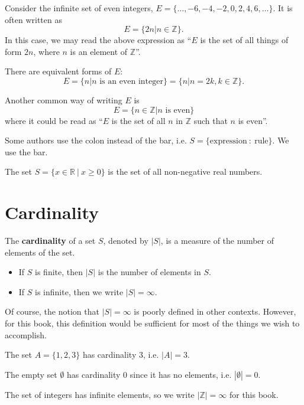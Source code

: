 \begin{example}
    Consider the infinite set of even integers, $E = \{\dots, -6, -4, -2, 0, 2, 4, 6, \dots\}$. It is often written as
    \[
        E = \{2n \vert n \in \mathbb{Z}\}.
    \]
    In this case, we may read the above expression as ``$E$ is the set of all things of form $2n$, where $n$ is an element of $\mathbb{Z}$''.

    There are equivalent forms of $E$:
    \[
        E = \{n \vert n \textrm{ is an even integer}\} = \{n \vert n = 2k, k \in \mathbb{Z}\}.
    \]

    Another common way of writing $E$ is
    \[
        E = \{n \in \mathbb{Z} \vert n \textrm{ is even}\}
    \]
    where it could be read as ``$E$ is the set of all $n$ in $\mathbb{Z}$ such that $n$ is even''.
\end{example}
\begin{remark}
    Some authors use the colon instead of the bar, i.e. $S = \{\mathrm{expression} \ : \ \mathrm{rule}\}$. We use the bar.
\end{remark}

\begin{example}
    The set $S = \{x \in \mathbb{R} \ | \ x \geq 0 \}$ is the set of all non-negative real numbers.
\end{example}

\section{Cardinality}
\begin{definition}
    The \textbf{cardinality} of a set $S$, denoted by $|S|$, is a measure of the number of elements of the set.
    \begin{itemize}
        \item If $S$ is finite, then $|S|$ is the number of elements in $S$.
        \item If $S$ is infinite, then we write $|S| = \infty$.
    \end{itemize}
\end{definition}
\begin{remark}
    Of course, the notion that $|S| = \infty$ is poorly defined in other contexts. However, for this book, this definition would be sufficient for most of the things we wish to accomplish.
\end{remark}
\begin{example}
    The set $A = \{1, 2, 3\}$ has cardinality 3, i.e. $|A| = 3$.
\end{example}
\begin{example}
    The empty set $\emptyset$ has cardinality 0 since it has no elements, i.e. $|\emptyset| = 0$.
\end{example}
\begin{example}
    The set of integers has infinite elements, so we write $|\mathbb{Z}| = \infty$ for this book.
\end{example}

